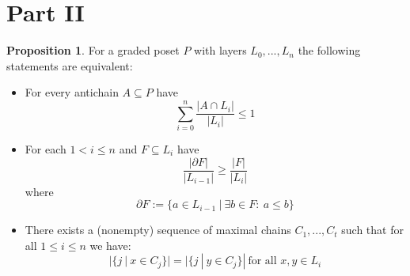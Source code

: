 \documentclass{scrartcl}
\theoremstyle{definition}
\newtheorem{proposition}[definition]{Proposition}
\begin{document}
\section{Part II}
\begin{proposition}
    \label{prop:characterization_lym}
    For a graded poset $P$ with layers $L_0, ..., L_n$ the following statements are equivalent:
    \begin{itemize}
        \item For every antichain $A \subseteq P$ have
        \begin{equation*}
            \sum_{i = 0}^n \frac {|A \cap L_i|} {|L_i|} \leq 1
        \end{equation*}
        \item For each $1 < i \leq n$ and $F \subseteq L_i$ have
        \begin{equation*}
            \frac {|\partial F|} {|L_{i - 1}|} \geq \frac {|F|} {|L_i|}
        \end{equation*}
        where
        \begin{equation*}
            \partial F := \{ a \in L_{i - 1} \ | \ \exists b \in F: \ a \leq b \}
        \end{equation*}
        \item There exists a (nonempty) sequence of maximal chains $C_1, ..., C_t$ such that for all $1 \leq i \leq n$ we have:
        \begin{equation*}
            |\{ j \ | \ x \in C_j \}| = |\{ j \ | \ y \in C_j \}| \ \text{for all $x, y \in L_i$}
        \end{equation*}
    \end{itemize}
\end{proposition}
\end{document}
